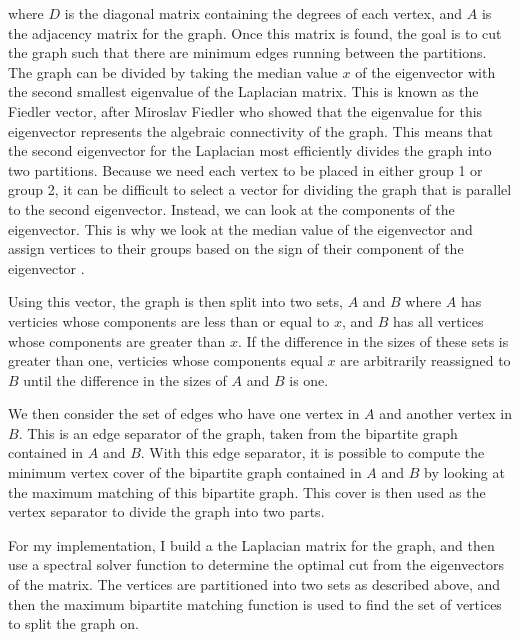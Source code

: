 \documentclass{article}
\begin{document}
    where $D$ is the diagonal matrix containing the degrees of each vertex, and $A$ is the adjacency matrix for the graph. Once this matrix is found, the goal is to cut the graph such that there are minimum edges running between the partitions. The graph can be divided by taking the median value $x$ of the eigenvector with the second smallest eigenvalue of the Laplacian matrix. This is known as the Fiedler vector, after Miroslav Fiedler who showed that the eigenvalue for this eigenvector represents the algebraic connectivity of the graph. This means that the second eigenvector for the Laplacian most efficiently divides the graph into two partitions. Because we need each vertex to be placed in either group 1 or group 2, it can be difficult to select a vector for dividing the graph that is parallel to the second eigenvector. Instead, we can look at the components of the eigenvector. This is why we look at the median value of the eigenvector and assign vertices to their groups based on the sign of their component of the eigenvector \cite{Newman2006.2}.
    \par
    Using this vector, the graph is then split into two sets, $A$ and $B$ where $A$ has verticies whose components are less than or equal to $x$, and $B$ has all vertices whose components are greater than $x$. If the difference in the sizes of these sets is greater than one, verticies whose components equal $x$ are arbitrarily reassigned to $B$ until the difference in the sizes of $A$ and $B$ is one.
    \par
    We then consider the set of edges who have one vertex in $A$ and another vertex in $B$. This is an edge separator of the graph, taken from the bipartite graph contained in $A$ and $B$. With this edge separator, it is possible to compute the minimum vertex cover of the bipartite graph contained in $A$ and $B$ by looking at the maximum matching of this bipartite graph. This cover is then used as the vertex separator to divide the graph into two parts.
    \par
    For my implementation, I build a the Laplacian matrix for the graph, and then use a spectral solver function to determine the optimal cut from the eigenvectors of the matrix. The vertices are partitioned into two sets as described above, and then the maximum bipartite matching function is used to find the set of vertices to split the graph on.
\end{document}
